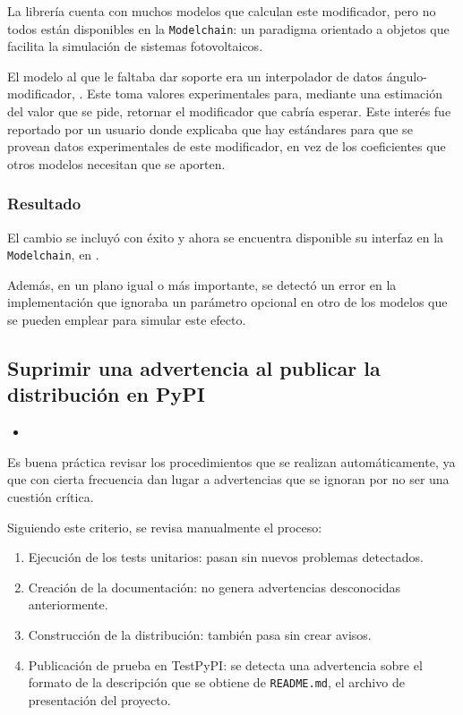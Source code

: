 La librería \pvlibpy{} cuenta con muchos modelos que calculan este modificador, pero no todos están disponibles en la \texttt{Modelchain}: un paradigma orientado a objetos que facilita la simulación de sistemas fotovoltaicos.

El modelo al que le faltaba dar soporte era un interpolador de datos ángulo-modificador, . Este toma valores experimentales para, mediante una estimación del valor que se pide, retornar el modificador que cabría esperar. Este interés fue reportado por un usuario donde explicaba que hay estándares para que se provean datos experimentales de este modificador, en vez de los coeficientes que otros modelos necesitan que se aporten.

\subsubsection{Resultado}

El cambio se incluyó con éxito y ahora se encuentra disponible su interfaz en la \texttt{Modelchain}, en .

Además, en un plano igual o más importante, se detectó un error en la implementación que ignoraba un \gls{parámetro} opcional en otro de los modelos que se pueden emplear para simular este efecto.

\subsection{Suprimir una advertencia al publicar la distribución en PyPI}

\begin{itemize}
    \item {}
\end{itemize}

Es buena práctica revisar los procedimientos que se realizan automáticamente, ya que con cierta frecuencia dan lugar a advertencias que se ignoran por no ser una cuestión crítica.

Siguiendo este criterio, se revisa manualmente el proceso:

\begin{enumerate}
    \item Ejecución de los tests unitarios: pasan sin nuevos problemas detectados.
    \item Creación de la documentación: no genera advertencias desconocidas anteriormente.
    \item Construcción de la distribución: también pasa sin crear avisos.
    \item Publicación de prueba en TestPyPI: se detecta una advertencia sobre el formato de la descripción que se obtiene de \texttt{README.md}, el archivo de presentación del proyecto.
\end{enumerate}

